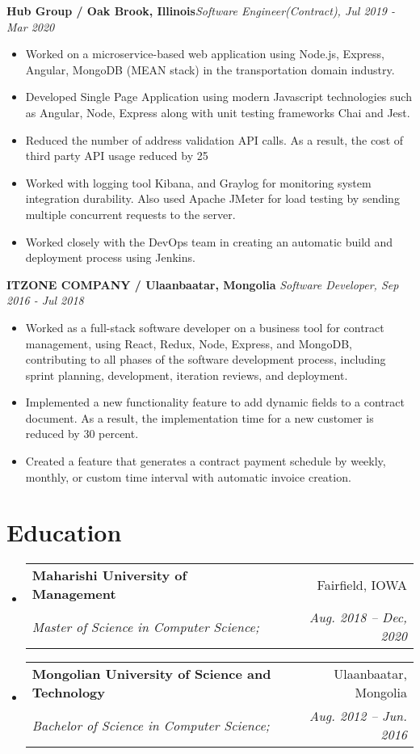 \documentclass[letterpaper,11pt]{article}
\makeatletter
\newcommand{\resumeSubheading}[4]{
  \vspace{-1pt}\item
    \begin{tabular*}{0.97\textwidth}[t]{l@{\extracolsep{\fill}}r}
      \textbf{#1} & #2 \\
      \textit{\small#3} & \textit{\small #4} \\
    \end{tabular*}\vspace{-5pt}
}
\newcommand{\resumeSubHeadingListStart}{\begin{itemize}[leftmargin=*]}
\newcommand{\resumeSubHeadingListEnd}{\end{itemize}}
\newcommand{\resumeItemListStart}{\begin{itemize}}
\newcommand{\resumeItemListEnd}{\end{itemize}\vspace{-5pt}}
\makeatother
\begin{document}
      \vfill
      \textbf{Hub Group / Oak Brook, Illinois}\hfill \textit{Software Engineer(Contract), Jul 2019 - Mar 2020}
      \resumeItemListStart
        \item{
          Worked on a microservice-based web application using Node.js, Express, Angular, MongoDB (MEAN stack) in the transportation domain industry.
        }
        \item{
          Developed Single Page Application using modern Javascript technologies such as Angular, Node, Express along with unit testing frameworks Chai and Jest. 
        }
        \item{
          Reduced the number of address validation API calls. As a result, the cost of third party API usage reduced by 25%
        }
        \item{
          Worked with logging tool Kibana, and Graylog for monitoring system integration durability. Also used Apache JMeter for load testing by sending multiple concurrent requests to the server.
        }
        \item{
          Worked closely with the DevOps team in creating an automatic build and deployment process using Jenkins. 
        }
      \resumeItemListEnd

      \vfill
      \textbf{ITZONE COMPANY / Ulaanbaatar, Mongolia }\hfill \textit{Software Developer, Sep 2016 - Jul 2018}
      \resumeItemListStart
        \item{
          Worked as a full-stack software developer on a business tool for contract management, using React, Redux, Node, Express, and MongoDB, contributing to all phases of the software development process, including sprint planning, development, iteration reviews, and deployment.
        }
        \item{
          Implemented a new functionality feature to add dynamic fields to a contract document. As a result, the implementation time for a new customer is reduced by 30 percent.
        }
        \item{
          Created a feature that generates a contract payment schedule by weekly, monthly, or custom time interval with automatic invoice creation.
        }
      \resumeItemListEnd
  
\section{Education}
  \resumeSubHeadingListStart
    \resumeSubheading
      {Maharishi University of Management}{Fairfield, IOWA}
      {Master of Science in Computer Science;}{Aug. 2018 -- Dec, 2020}
    \resumeSubheading
      {Mongolian University of Science and Technology}{Ulaanbaatar, Mongolia}
      {Bachelor of Science in Computer Science;}{Aug. 2012 -- Jun. 2016}
  \resumeSubHeadingListEnd

\end{document}

